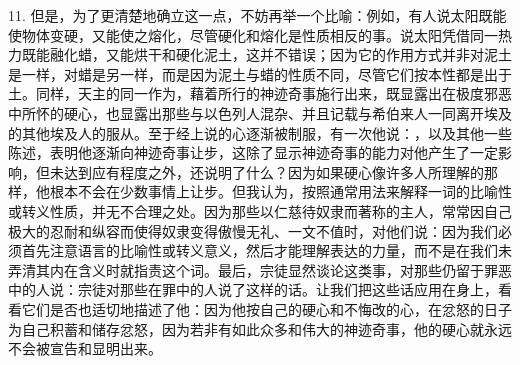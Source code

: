 11. 但是，为了更清楚地确立这一点，不妨再举一个比喻：例如，有人说太阳既能使物体变硬，又能使之熔化，尽管硬化和熔化是性质相反的事。说太阳凭借同一热力既能融化蜡，又能烘干和硬化泥土，这并不错误；因为它的作用方式并非对泥土是一样，对蜡是另一样，而是因为泥土与蜡的性质不同，尽管它们按本性都是出于土。同样，天主的同一作为，藉着所行的神迹奇事施行出来，既显露出在极度邪恶中所怀的硬心，也显露出那些与以色列人混杂、并且记载与希伯来人一同离开埃及的其他埃及人的服从。至于经上说的心逐渐被制服，有一次他说：，以及其他一些陈述，表明他逐渐向神迹奇事让步，这除了显示神迹奇事的能力对他产生了一定影响，但未达到应有程度之外，还说明了什么？因为如果硬心像许多人所理解的那样，他根本不会在少数事情上让步。但我认为，按照通常用法来解释一词的比喻性或转义性质，并无不合理之处。因为那些以仁慈待奴隶而著称的主人，常常因自己极大的忍耐和纵容而使得奴隶变得傲慢无礼、一文不值时，对他们说：因为我们必须首先注意语言的比喻性或转义意义，然后才能理解表达的力量，而不是在我们未弄清其内在含义时就指责这个词。最后，宗徒显然谈论这类事，对那些仍留于罪恶中的人说：宗徒对那些在罪中的人说了这样的话。让我们把这些话应用在身上，看看它们是否也适切地描述了他：因为他按自己的硬心和不悔改的心，在忿怒的日子为自己积蓄和储存忿怒，因为若非有如此众多和伟大的神迹奇事，他的硬心就永远不会被宣告和显明出来。\par

